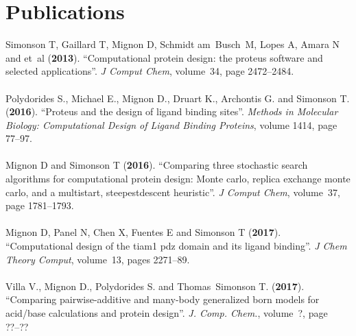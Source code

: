 \chapter*{Publications}
Simonson T, Gaillard T, Mignon D, Schmidt am~Busch~M, Lopes A, Amara N and
  et~al (\textbf{2013}).
\newblock \enquote{Computational protein design: the proteus software and
  selected applications}.
\newblock \emph{J Comput Chem}, volume~34, page 2472–2484.\\ \\
Polydorides S., Michael E., Mignon D., Druart K., Archontis G. and Simonson T.
  (\textbf{2016}).
\newblock \enquote{Proteus and the design of ligand binding sites}.
\newblock \emph{Methods in Molecular Biology: Computational Design of Ligand
  Binding Proteins}, volume 1414, page 77–97.\\ \\
Mignon D and Simonson T (\textbf{2016}).
\newblock \enquote{Comparing three stochastic search algorithms for
  computational protein design: Monte carlo, replica exchange monte carlo, and
  a multistart, steepestdescent heuristic}.
\newblock \emph{J Comput Chem}, volume~37, page 1781–1793.\\ \\
Mignon D, Panel N, Chen X, Fuentes E and Simonson T (\textbf{2017}).
\newblock \enquote{Computational design of the tiam1 pdz domain and its ligand
  binding}.
\newblock \emph{J Chem Theory Comput}, volume~13, pages 2271--89.\\ \\
Villa V., Mignon D., Polydorides S. and Thomas~Simonson T. (\textbf{2017}).
\newblock \enquote{Comparing pairwise-additive and many-body generalized born
  models for acid/base calculations and protein design}.
\newblock \emph{J. Comp. Chem.}, volume~?, page ??–??










